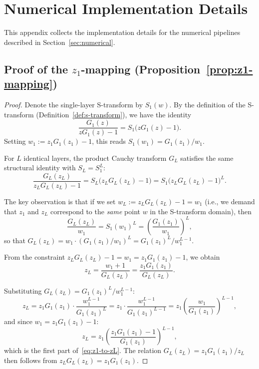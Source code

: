 
\section{Numerical Implementation Details}\label{app:numerical-details}

This appendix collects the implementation details for the numerical pipelines described in Section~\ref{sec:numerical}.

\subsection{Proof of the $z_1$-mapping (Proposition~\ref{prop:z1-mapping})}\label{app:z1-proof}

\begin{proof}
Denote the single-layer S-transform by $S_1(w)$.
By the definition of the S-transform (Definition~\ref{def:s-transform}), we have the identity
\begin{equation}\label{eq:s-cauchy-relation}
\frac{G_1(z)}{zG_1(z) - 1} = S_1\bigl(zG_1(z) - 1\bigr).
\end{equation}
Setting $w_1 := z_1 G_1(z_1) - 1$, this reads $S_1(w_1) = G_1(z_1) / w_1$.

For $L$ identical layers, the product Cauchy transform $G_L$ satisfies the same structural identity with $S_L = S_1^L$:
\begin{equation}
\frac{G_L(z_L)}{z_L G_L(z_L) - 1} = S_L\bigl(z_L G_L(z_L) - 1\bigr) = S_1\bigl(z_L G_L(z_L) - 1\bigr)^L.
\end{equation}

The key observation is that if we set $w_L := z_L G_L(z_L) - 1 = w_1$ (i.e., we demand that $z_1$ and $z_L$ correspond to the \emph{same} point $w$ in the S-transform domain), then
\begin{equation}
\frac{G_L(z_L)}{w_1} = S_1(w_1)^L = \left(\frac{G_1(z_1)}{w_1}\right)^L,
\end{equation}
so that $G_L(z_L) = w_1 \cdot (G_1(z_1)/w_1)^L = G_1(z_1)^L / w_1^{L-1}$.

From the constraint $z_L G_L(z_L) - 1 = w_1 = z_1 G_1(z_1) - 1$, we obtain
\begin{equation}
z_L = \frac{w_1 + 1}{G_L(z_L)} = \frac{z_1 G_1(z_1)}{G_L(z_L)}.
\end{equation}

Substituting $G_L(z_L) = G_1(z_1)^L / w_1^{L-1}$:
\begin{equation}
z_L = z_1 G_1(z_1) \cdot \frac{w_1^{L-1}}{G_1(z_1)^L} = z_1 \cdot \frac{w_1^{L-1}}{G_1(z_1)^{L-1}} = z_1 \left(\frac{w_1}{G_1(z_1)}\right)^{L-1},
\end{equation}
and since $w_1 = z_1 G_1(z_1) - 1$:
\begin{equation}
z_L = z_1 \left(\frac{z_1 G_1(z_1) - 1}{G_1(z_1)}\right)^{L-1},
\end{equation}
which is the first part of~\eqref{eq:z1-to-zL}. The relation $G_L(z_L) = z_1 G_1(z_1)/z_L$ then follows from $z_L G_L(z_L) = z_1 G_1(z_1)$.
\end{proof}

